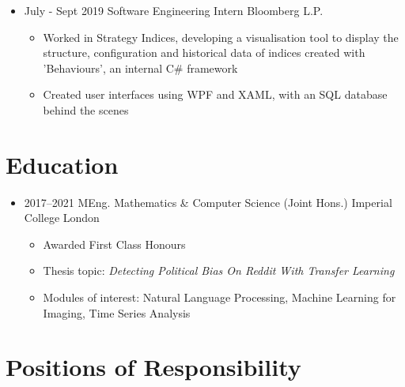 \documentclass[11pt,a4paper,sans]{moderncv}        %
\begin{document}
\begin{itemize}
\item{
\cventry
{July - Sept 2019}
{Software Engineering Intern}
{Bloomberg L.P.}
{}{}{
\begin{itemize}
\item Worked in Strategy Indices, developing a visualisation tool to display the structure, configuration and historical data of indices created with 'Behaviours', an internal C\# framework
\item Created user interfaces using WPF and XAML, with an SQL database behind the scenes
\end{itemize}
}}

\end{itemize}

\section{Education}

\begin{itemize}

\item{
\cventry
{2017--2021}
{MEng. Mathematics \& Computer Science (Joint Hons.)}
{Imperial College London}
{}{}{
\begin{itemize}
\item Awarded First Class Honours
\item Thesis topic: \textit{Detecting Political Bias On Reddit With Transfer Learning}
\item Modules of interest: Natural Language Processing, Machine Learning for Imaging, Time Series Analysis
\end{itemize}
}} %

\end{itemize}

\vspace{-10pt}

\section{Positions of Responsibility}
\end{document}
